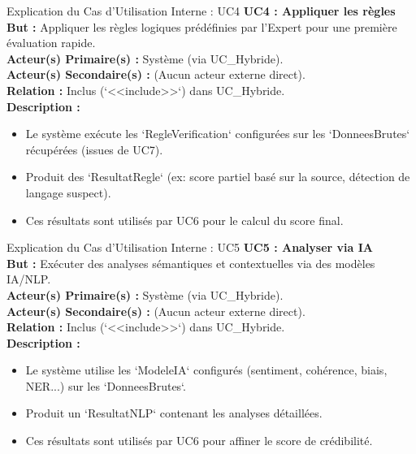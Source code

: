 \documentclass[9pt]{beamer}
\begin{document}
\begin{frame}{Explication du Cas d'Utilisation Interne : UC4}
    \textbf{UC4 : Appliquer les règles} \\ %
    \textbf{But :} Appliquer les règles logiques prédéfinies par l'Expert pour une première évaluation rapide. \\
    \textbf{Acteur(s) Primaire(s) :} Système (via UC\_Hybride). \\
    \textbf{Acteur(s) Secondaire(s) :} (Aucun acteur externe direct). \\
    \textbf{Relation :} Inclus (`<<include>>`) dans UC\_Hybride. \\
    \textbf{Description :}
    \begin{itemize}
        \item Le système exécute les `RegleVerification` configurées sur les `DonneesBrutes` récupérées (issues de UC7).
        \item Produit des `ResultatRegle` (ex: score partiel basé sur la source, détection de langage suspect).
        \item Ces résultats sont utilisés par UC6 pour le calcul du score final.
    \end{itemize}
\end{frame}

\begin{frame}{Explication du Cas d'Utilisation Interne : UC5}
    \textbf{UC5 : Analyser via IA} \\ %
    \textbf{But :} Exécuter des analyses sémantiques et contextuelles via des modèles IA/NLP. \\
    \textbf{Acteur(s) Primaire(s) :} Système (via UC\_Hybride). \\
    \textbf{Acteur(s) Secondaire(s) :} (Aucun acteur externe direct). \\
    \textbf{Relation :} Inclus (`<<include>>`) dans UC\_Hybride. \\
    \textbf{Description :}
    \begin{itemize}
        \item Le système utilise les `ModeleIA` configurés (sentiment, cohérence, biais, NER...) sur les `DonneesBrutes`.
        \item Produit un `ResultatNLP` contenant les analyses détaillées.
        \item Ces résultats sont utilisés par UC6 pour affiner le score de crédibilité.
    \end{itemize}
\end{frame}
\end{document}
